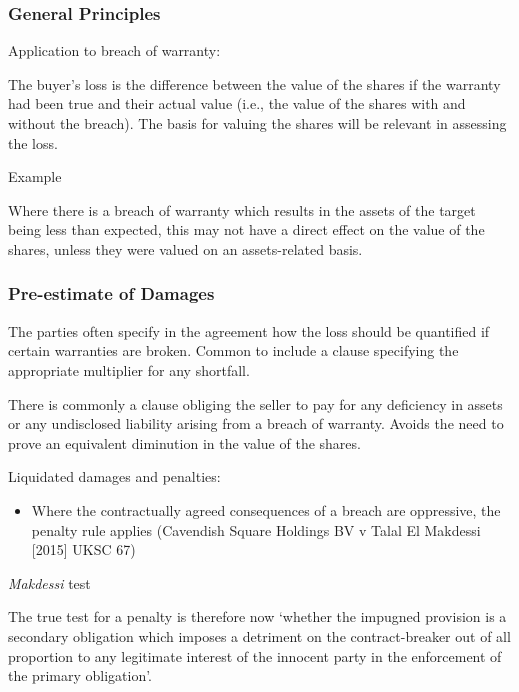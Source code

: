 \documentclass[
]{article}
\providecommand{\tightlist}{%
  \setlength{\itemsep}{0pt}\setlength{\parskip}{0pt}}
\newenvironment{env-b225a0d9-0c32-46a2-8b5d-c7fc92570012}
{
    \savenotes\tcolorbox[blanker,breakable,left=5pt,borderline west={2pt}{-4pt}{pink}]
}
{
    \endtcolorbox\spewnotes
}
\newenvironment{env-c5a21b51-dc78-4e82-bd56-c0130c2151f9}
{
    \savenotes\tcolorbox[blanker,breakable,left=5pt,borderline west={2pt}{-4pt}{purple}]
}
{
    \endtcolorbox\spewnotes
}
\begin{document}
\hypertarget{general-principles}{%
\subsubsection{General Principles}\label{general-principles}}

Application to breach of warranty:

The buyer's loss is the difference between the value of the shares if
the warranty had been true and their actual value (i.e., the value of
the shares with and without the breach). The basis for valuing the
shares will be relevant in assessing the loss.

\begin{env-c5a21b51-dc78-4e82-bd56-c0130c2151f9}

Example

Where there is a breach of warranty which results in the assets of the
target being less than expected, this may not have a direct effect on
the value of the shares, unless they were valued on an assets-related
basis.

\end{env-c5a21b51-dc78-4e82-bd56-c0130c2151f9}

\hypertarget{pre-estimate-of-damages}{%
\subsubsection{Pre-estimate of Damages}\label{pre-estimate-of-damages}}

The parties often specify in the agreement how the loss should be
quantified if certain warranties are broken. Common to include a clause
specifying the appropriate multiplier for any shortfall.

There is commonly a clause obliging the seller to pay for any deficiency
in assets or any undisclosed liability arising from a breach of
warranty. Avoids the need to prove an equivalent diminution in the value
of the shares.

Liquidated damages and penalties:

\begin{itemize}
\tightlist
\item
  Where the contractually agreed consequences of a breach are
  oppressive, the penalty rule applies (Cavendish Square Holdings BV v
  Talal El Makdessi {[}2015{]} UKSC 67)
\end{itemize}

\begin{env-b225a0d9-0c32-46a2-8b5d-c7fc92570012}

\emph{Makdessi} test

The true test for a penalty is therefore now `whether the impugned
provision is a secondary obligation which imposes a detriment on the
contract-breaker out of all proportion to any legitimate interest of the
innocent party in the enforcement of the primary obligation'.

\end{env-b225a0d9-0c32-46a2-8b5d-c7fc92570012}
\end{document}
